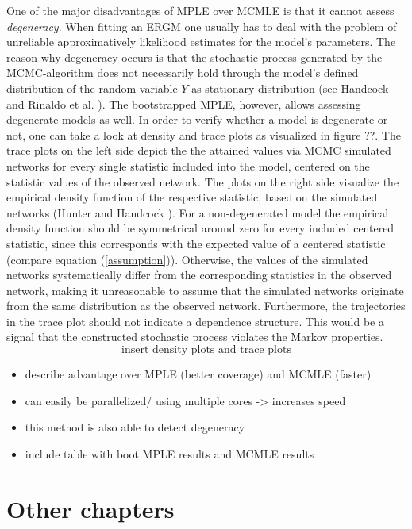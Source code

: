 \documentclass[headsepline=true, abstracton]{scrartcl}
\begin{document}
One of the major disadvantages of MPLE over MCMLE is that it cannot assess {\it degeneracy}. When fitting an ERGM one usually has to deal with the problem of unreliable approximatively likelihood estimates for the model's parameters. The reason why degeneracy occurs is that the stochastic process generated by the MCMC-algorithm does not necessarily hold through the model's defined distribution of the random variable $Y$ as stationary distribution (see Handcock \cite{Handcock.2003} and Rinaldo et al. \cite{Rinaldo2009}). The bootstrapped MPLE, however, allows assessing degenerate models as well. In order to verify whether a model is degenerate or not, one can take a look at density and trace plots as visualized in figure ??. The trace plots on the left side depict the the attained values via MCMC simulated networks for every single statistic included into the model, centered on the statistic values of the observed network. The plots on the right side visualize the empirical density function of the respective statistic, based on the simulated networks (Hunter and Handcock \cite{Hunter.2006}). For a non-degenerated model the empirical density function should be symmetrical around zero for every included centered statistic, since this corresponds with the expected value of a centered statistic (compare equation (\ref{assumption})). 
Otherwise, the values of the simulated networks systematically differ from the corresponding statistics in the observed network, making it unreasonable to assume that the simulated networks originate from the same distribution as the observed network. Furthermore, the trajectories in the trace plot should not indicate a dependence structure. This would be a signal that the constructed stochastic process violates the Markov properties.
$$\text{insert density plots and trace plots}$$

\begin{itemize}

\item describe advantage over MPLE (better coverage) and MCMLE (faster)
\item can easily be parallelized/ using multiple cores -> increases speed
\item this method is also able to detect degeneracy
\item include table with boot MPLE results and MCMLE results
\end{itemize}


 \section*{Other chapters}
 
\end{document}
